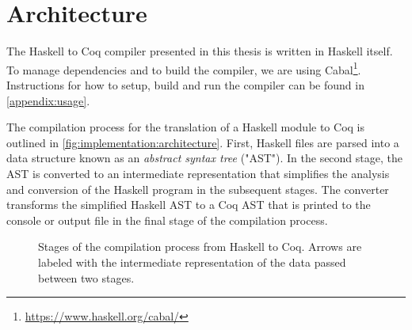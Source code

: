 \section{Architecture} \label{sec:implementation:architecture}
The Haskell to Coq compiler presented in this thesis is written in Haskell itself.
To manage dependencies and to build the compiler, we are using Cabal\footnote{\url{https://www.haskell.org/cabal/}}.
Instructions for how to setup, build and run the compiler can be found in \autoref{appendix:usage}.

The compilation process for the translation of a Haskell module to Coq is outlined in \autoref{fig:implementation:architecture}.
First, Haskell files are parsed into a data structure known as an \textit{abstract syntax tree} ("AST").
In the second stage, the AST is converted to an intermediate representation that simplifies the analysis and conversion of the Haskell program in the subsequent stages.
The converter transforms the simplified Haskell AST to a Coq AST that is printed to the console or output file in the final stage of the compilation process.

\begin{figure}[p]
  \caption{
    Stages of the compilation process from Haskell to Coq.
    Arrows are labeled with the intermediate representation of the data passed between two stages.
  }
  \label{fig:implementation:architecture}
\end{figure}

